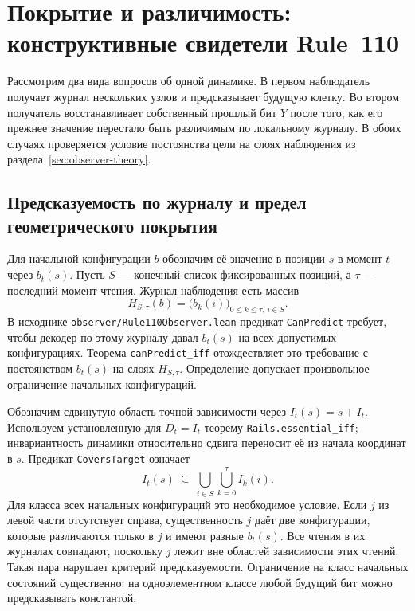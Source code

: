 \section{Покрытие и различимость: конструктивные свидетели Rule~110}
\label{sec:observer-witnesses}

Рассмотрим два вида вопросов об одной динамике. В первом наблюдатель получает
журнал нескольких узлов и предсказывает будущую клетку. Во втором получатель
восстанавливает собственный прошлый бит $Y$ после того, как его прежнее
значение перестало быть различимым по локальному журналу. В обоих случаях
проверяется условие постоянства цели на слоях наблюдения из
раздела~\ref{sec:observer-theory}.

\subsection{Предсказуемость по журналу и предел геометрического покрытия}
\label{sec:observer-coverage}

Для начальной конфигурации $b$ обозначим её значение в позиции $s$ в момент
$t$ через $b_t(s)$. Пусть $S$ --- конечный список фиксированных позиций, а
$\tau$ --- последний момент чтения. Журнал наблюдения есть массив
\[
 H_{S,\tau}(b)=\bigl(b_k(i)\bigr)_{0\le k\le\tau,\,i\in S}.
\]
В исходнике \nolinkurl{observer/Rule110Observer.lean} предикат
\texttt{CanPredict} требует, чтобы декодер по этому журналу давал $b_t(s)$
на всех допустимых конфигурациях. Теорема \texttt{canPredict\_iff}
отождествляет это требование с постоянством $b_t(s)$ на слоях $H_{S,\tau}$.
Определение допускает произвольное ограничение начальных конфигураций.

Обозначим сдвинутую область точной зависимости через $I_t(s)=s+I_t$.
Используем установленную для $D_t=I_t$ теорему
\texttt{Rails.essential\_iff}; инвариантность динамики относительно сдвига
переносит её из начала координат в $s$. Предикат \texttt{CoversTarget} означает
\begin{equation}
 I_t(s)\ \subseteq\ \bigcup_{i\in S}\bigcup_{k=0}^{\tau} I_k(i).
 \label{eq:observer-cover}
\end{equation}
Для класса всех начальных конфигураций это необходимое условие. Если $j$
из левой части отсутствует справа, существенность $j$ даёт две конфигурации,
которые различаются только в $j$ и имеют разные $b_t(s)$. Все чтения в их
журналах совпадают, поскольку $j$ лежит вне областей зависимости этих чтений.
Такая пара нарушает критерий предсказуемости. Ограничение на класс начальных
состояний существенно: на одноэлементном классе любой будущий бит можно
предсказывать константой.

